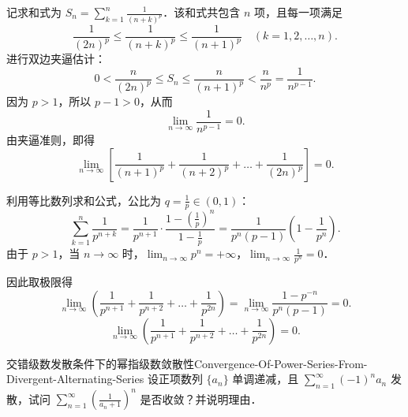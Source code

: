 \begin{solution}

    记求和式为 $S_n = \sum_{k=1}^n \frac{1}{(n+k)^p}$．该和式共包含 $n$ 项，且每一项满足
    \begin{equation}
        \frac{1}{(2n)^p} \leqslant \frac{1}{(n+k)^p} \leqslant \frac{1}{(n+1)^p} \quad (k = 1, 2, \dots, n).
    \end{equation}
    进行双边夹逼估计：
    \begin{equation}
        0 < \frac{n}{(2n)^p} \leqslant S_n \leqslant \frac{n}{(n+1)^p} < \frac{n}{n^p} = \frac{1}{n^{p-1}}.
    \end{equation}
    因为 $p > 1$，所以 $p - 1 > 0$，从而
    \begin{equation}
        \lim_{n\to\infty} \frac{1}{n^{p-1}} = 0.
    \end{equation}
    由夹逼准则，即得
    \begin{equation}
        \boxed{\lim_{n\to\infty} \left[ \frac{1}{(n+1)^p} + \frac{1}{(n+2)^p} + \dots + \frac{1}{(2n)^p} \right] = 0.}
    \end{equation}


    利用等比数列求和公式，公比为 $q = \frac{1}{p} \in (0, 1)$：
    \begin{equation}
        \sum_{k=1}^n \frac{1}{p^{n+k}} = \frac{1}{p^{n+1}} \cdot \frac{1 - \left(\frac{1}{p}\right)^n}{1 - \frac{1}{p}} = \frac{1}{p^n(p - 1)}\left(1 - \frac{1}{p^n}\right).
    \end{equation}
    由于 $p > 1$，当 $n \to \infty$ 时，$\lim_{n\to\infty} p^n = +\infty$，$\lim_{n\to\infty} \frac{1}{p^n} = 0$．

    因此取极限得
    \begin{equation}
        \lim_{n\to\infty} \left( \frac{1}{p^{n+1}} + \frac{1}{p^{n+2}} + \dots + \frac{1}{p^{2n}} \right) = \lim_{n\to\infty} \frac{1 - p^{-n}}{p^n(p - 1)} = 0.
    \end{equation}
    \begin{equation}
        \boxed{\lim_{n\to\infty} \left( \frac{1}{p^{n+1}} + \frac{1}{p^{n+2}} + \dots + \frac{1}{p^{2n}} \right) = 0.}
    \end{equation}
\end{solution}

\begin{problem}{交错级数发散条件下的幂指级数敛散性}{Convergence-Of-Power-Series-From-Divergent-Alternating-Series}
    设正项数列 $\{a_n\}$ 单调递减，且 $\sum_{n=1}^\infty (-1)^n a_n$ 发散，试问 $\sum_{n=1}^\infty \left(\frac{1}{a_n + 1}\right)^n$ 是否收敛？并说明理由．
\end{problem}

